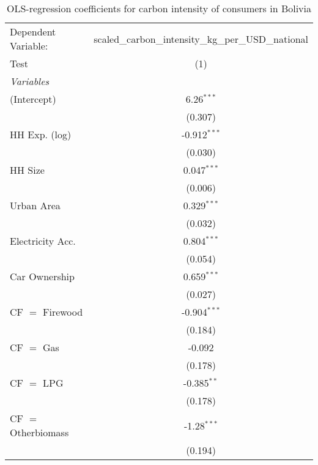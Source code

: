 
\begin{table}[htbp!]
   \centering
   \small
   \begin{adjustbox}{width = 1\textwidth, max height = 0.95\textheight, center}
      \begin{threeparttable}[b]
         \caption{\label{tab:OLS_1_BOL} OLS-regression coefficients for carbon intensity of consumers in Bolivia}
         \begin{tabular}{lc}
            \tabularnewline \midrule \midrule
            Dependent Variable: & scaled\_carbon\_intensity\_kg\_per\_USD\_national\\        
            Test                & (1)\\  
            \midrule
            \emph{Variables}\\
            (Intercept)         & 6.26$^{***}$\\   
                                & (0.307)\\   
            HH Exp. (log)       & -0.912$^{***}$\\   
                                & (0.030)\\   
            HH Size             & 0.047$^{***}$\\   
                                & (0.006)\\   
            Urban Area          & 0.329$^{***}$\\   
                                & (0.032)\\   
            Electricity Acc.    & 0.804$^{***}$\\   
                                & (0.054)\\   
            Car Ownership       & 0.659$^{***}$\\   
                                & (0.027)\\   
            CF $=$ Firewood     & -0.904$^{***}$\\   
                                & (0.184)\\   
            CF $=$ Gas          & -0.092\\   
                                & (0.178)\\   
            CF $=$ LPG          & -0.385$^{**}$\\   
                                & (0.178)\\   
            CF $=$ Otherbiomass & -1.28$^{***}$\\   
                                & (0.194)\\   

\end{tabular}
\end{threeparttable}
\end{adjustbox}
\end{table}
